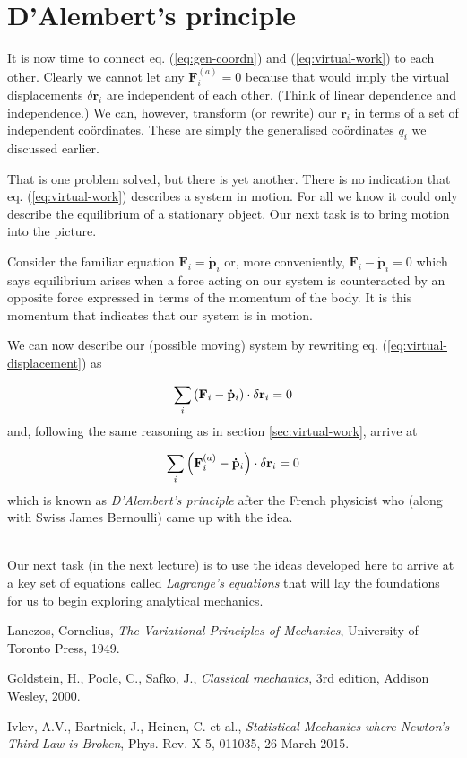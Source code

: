 \documentclass[english,seminar,headertitle]{lecture}
\begin{document}
\section{D'Alembert's principle}\label{sec:d'alemberts-principle}
It is now time to connect eq. (\ref{eq:gen-coordn}) and (\ref{eq:virtual-work}) to each other. Clearly we cannot let any $\mathbf{F}_i^{(a)} = 0$ because that would imply the virtual displacements $\delta \mathbf{r}_i$ are independent of each other. (Think of linear dependence and independence.) We can, however, transform (or rewrite) our $\mathbf{r}_i$ in terms of a set of independent co\"{o}rdinates. These are simply the generalised co\"{o}rdinates $q_i$ we discussed earlier.

That is one problem solved, but there is yet another. There is no indication that eq. (\ref{eq:virtual-work}) describes a system in motion. For all we know it could only describe the equilibrium of a stationary object. Our next task is to bring motion into the picture.

Consider the familiar equation $\mathbf{F}_i = \mathbf{\dot{p}}_i$ or, more conveniently, $\mathbf{F}_i - \mathbf{\dot{p}}_i = 0$ which says equilibrium arises when a force acting on our system is counteracted by an opposite force expressed in terms of the momentum of the body. It is this momentum that indicates that our system is in motion.

We can now describe our (possible moving) system by rewriting eq. (\ref{eq:virtual-displacement}) as

$$
\sum\displaylimits_i \left( \mathbf{F}_i - \mathbf{\dot{p}}_i \right) \cdot \delta \mathbf{r}_i = 0
$$
%
and, following the same reasoning as in section \ref{sec:virtual-work}, arrive at

\begin{align}
	\sum\displaylimits_i \left( \mathbf{F}_i^{(a)} - \mathbf{\dot{p}}_i \right) \cdot \delta \mathbf{r}_i = 0 \label{eq:d'alembert}
\end{align}
%
which is known as \textit{D'Alembert's principle} after the French physicist who (along with Swiss James Bernoulli) came up with the idea.

\\Our next task (in the next lecture) is to use the ideas developed here to arrive at a key set of equations called \textit{Lagrange's equations} that will lay the foundations for us to begin exploring analytical mechanics.

%
\begin{thebibliography}{1}
	Lanczos, Cornelius, \textit{The Variational Principles of Mechanics}, University of Toronto Press, 1949.
	
	Goldstein, H., Poole, C., Safko, J., \textit{Classical mechanics}, 3rd edition, Addison Wesley, 2000.
	
	Ivlev, A.V., Bartnick, J., Heinen, C. et al., \textit{Statistical Mechanics where Newton's Third Law is Broken}, Phys. Rev. X 5, 011035, 26 March 2015.
\end{thebibliography}
\end{document}
